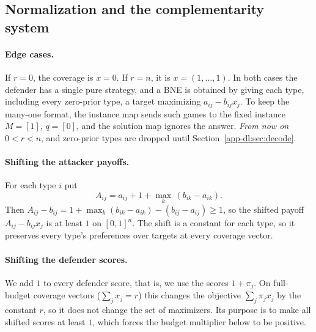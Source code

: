 \subsection{Normalization and the complementarity system}\label{app-dl:sec:lcp}

\paragraph{Edge cases.} If $r=0$, the coverage is $x=0$. If $r=n$, it is $x=(1,\dots,1)$. In both cases
the defender has a single pure strategy, and a BNE is obtained by giving each type, including every
zero-prior type, a target maximizing $a_{ij}-b_{ij}x_j$. To keep the many-one format, the instance map
sends such games to the fixed instance $M=[1]$, $q=[0]$, and the solution map ignores the answer.
\emph{From now on $0<r<n$}, and zero-prior types are dropped until Section~\ref{app-dl:sec:decode}.

\paragraph{Shifting the attacker payoffs.} For each type $i$ put
\[
  A_{ij}=a_{ij}+1+\max_k\,(b_{ik}-a_{ik}) .
\]
Then $A_{ij}-b_{ij}=1+\max_k(b_{ik}-a_{ik})-(b_{ij}-a_{ij})\ge1$, so the shifted payoff
$A_{ij}-b_{ij}x_j$ is at least $1$ on $[0,1]^n$. The shift is a constant for each type, so it preserves
every type's preferences over targets at every coverage vector.

\paragraph{Shifting the defender scores.} We add $1$ to every defender score, that is, we use the scores
$1+\pi_j$. On full-budget coverage vectors ($\sum_jx_j=r$) this changes the objective
$\sum_j\pi_jx_j$ by the constant $r$, so it does not change the set of maximizers. Its purpose is to make
all shifted scores at least $1$, which forces the budget multiplier below to be positive.

